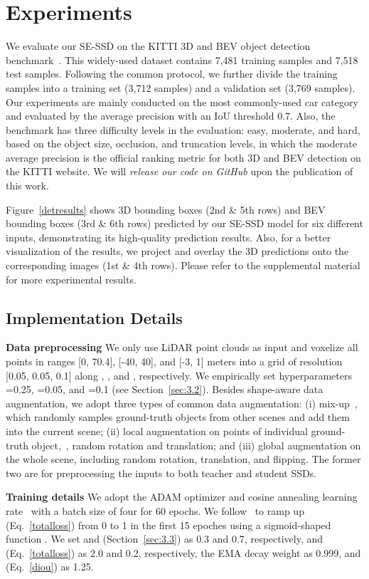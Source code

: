 \documentclass[letterpaper]{article}
\begin{document}
\section{Experiments}
We evaluate our SE-SSD on the KITTI 3D and BEV object detection benchmark~\cite{geiger2013vision}.
This widely-used dataset contains 7,481 training samples and 7,518 test samples.
Following the common protocol, we further divide the training samples into a training set (3,712 samples) and a validation set (3,769 samples).
Our experiments are mainly conducted on the most commonly-used car category and evaluated by the average precision with an IoU threshold 0.7.
Also, the benchmark has three difficulty levels in the evaluation: easy, moderate, and hard, based on the object size, occlusion, and truncation levels, in which the moderate average precision is the official ranking metric for both 3D and BEV detection on the KITTI website.
We will {\em release our code on GitHub\/} upon the publication of this work.

Figure~\ref{detresults} shows 3D bounding boxes (2nd \& 5th rows) and BEV bounding boxes (3rd \& 6th rows) predicted by our SE-SSD model for six different inputs, demonstrating its high-quality prediction results.
Also, for a better visualization of the results, we project and overlay the 3D predictions onto the corresponding images (1st \& 4th rows).
Please refer to the supplemental material for more experimental results.

\subsection{Implementation Details}
\textbf{Data preprocessing}
We only use LiDAR point clouds as input and voxelize all points in ranges [0, 70.4], [-40, 40], and [-3, 1] meters into a grid of resolution [0.05, 0.05, 0.1] along , , and , respectively.
We empirically set hyperparameters =0.25, =0.05, and =0.1 (see Section~\ref{sec:3.2}).
Besides shape-aware data augmentation, we adopt three types of common data augmentation:
(i) mix-up~\cite{yan2018second}, which randomly samples ground-truth objects from other scenes and add them into the current scene;
(ii) local augmentation on points of individual ground-truth object,~\eg, random rotation and translation; and
(iii) global augmentation on the whole scene, including random rotation, translation, and flipping.
The former two are for preprocessing the inputs to both teacher and student SSDs.


\textbf{Training details}
We adopt the ADAM optimizer and cosine annealing learning rate~\cite{loshchilov2016sgdr} with a batch size of four for 60 epochs.
We follow~\cite{tarvainen2017mean} to ramp up  (Eq.~\eqref{totalloss}) from 0 to 1 in the first 15 epoches using a sigmoid-shaped function .
We set
 and  (Section~\ref{sec:3.3}) as 0.3 and 0.7, respectively,
 and  (Eq.~\eqref{totalloss}) as 2.0 and 0.2, respectively,
the EMA decay weight as 0.999, and
 (Eq.~\eqref{diou}) as 1.25.
\end{document}
